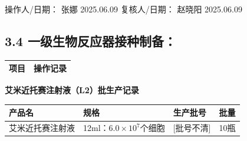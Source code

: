 \documentclass[UTF8,10pt,a4paper,fontset=fandol]{ctexart}
\newcommand{\fieldvalue}[1]{#1}
\newcommand{\handwritten}[1]{#1}
\begin{document}
\noindent
操作人/日期：
\fieldvalue{\handwritten{张娜}}
\quad
\fieldvalue{\handwritten{2025.06.09}}
\hfill
复核人/日期：
\fieldvalue{\handwritten{赵晓阳}}
\quad
\fieldvalue{\handwritten{2025.06.09}}

\subsection*{3.4 一级生物反应器接种制备：}

\begin{tabularx}{\textwidth}{|>{\centering\arraybackslash}X|>{\centering\arraybackslash}X|}
\hline
项目 & 操作记录 \\
\hline
\end{tabularx}


\newpage

\begin{center}
\textbf{艾米近托赛注射液（L2）批生产记录}
\end{center}

\begin{tabularx}{\textwidth}{|p{}|X|p{}|p{}|}
\hline
产品名 & 规格 & 生产批号 & 批量 \\
\hline
\fieldvalue{艾米近托赛注射液}
&
\fieldvalue{12ml：$6.0\times10^{7}$个细胞}
&
\fieldvalue{\handwritten{[批号不清]}}
&
\fieldvalue{\handwritten{10瓶}}
\\
\hline
\end{tabularx}

\vspace{2mm}
\end{document}
